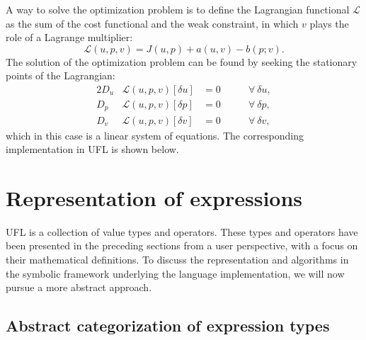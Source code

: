\documentclass[prodmode,acmtoms]{acmsmall}
\begin{document}
A way to solve the optimization problem is to define the Lagrangian
functional $\mathcal{L}$ as the sum of the cost functional and the
weak constraint, in which $v$ plays the role of a Lagrange multiplier:
\begin{equation}
  \mathcal{L}(u, p, v) = J(u, p) + a(u, v) - b(p; v).
\end{equation}
The solution of the optimization problem can be found by seeking the
stationary points of the Lagrangian:
\begin{alignat}{2}
  D_u &\mathcal{L}(u, p, v)[\delta u] &= 0 \qquad & \forall \ \delta u, \\
  D_p &\mathcal{L}(u, p, v)[\delta p] &= 0 \qquad & \forall \ \delta p, \\
  D_v &\mathcal{L}(u, p, v)[\delta v] &= 0 \qquad & \forall \ \delta v,
\end{alignat}
which in this case is a linear system of equations. The corresponding
implementation in UFL is shown below.


\section{Representation of expressions}
\label{sec:representation}

UFL is a collection of value types and operators. These types and
operators have been presented in the preceding sections from a user
perspective, with a focus on their mathematical definitions.  To
discuss the representation and algorithms in the symbolic framework
underlying the language implementation, we will now pursue a more
abstract approach.

\subsection{Abstract categorization of expression types}
\end{document}
